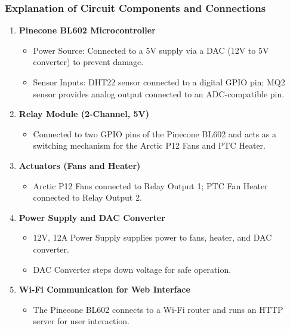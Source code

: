 \documentclass[a4paper]{scrartcl}
\begin{document}
\subsubsection{Explanation of Circuit Components and Connections}
\begin{enumerate}
    \item \textbf{Pinecone BL602 Microcontroller}
    \begin{itemize}
        \item Power Source: Connected to a 5V supply via a DAC (12V to 5V converter) to prevent damage.
        \item Sensor Inputs: DHT22 sensor connected to a digital GPIO pin; MQ2 sensor provides analog output connected to an ADC-compatible pin.
    \end{itemize}
    
    \item \textbf{Relay Module (2-Channel, 5V)}
    \begin{itemize}
        \item Connected to two GPIO pins of the Pinecone BL602 and acts as a switching mechanism for the Arctic P12 Fans and PTC Heater.
    \end{itemize}
    
    \item \textbf{Actuators (Fans and Heater)}
    \begin{itemize}
        \item Arctic P12 Fans connected to Relay Output 1; PTC Fan Heater connected to Relay Output 2.
    \end{itemize}
    
    \item \textbf{Power Supply and DAC Converter}
    \begin{itemize}
        \item 12V, 12A Power Supply supplies power to fans, heater, and DAC converter.
        \item DAC Converter steps down voltage for safe operation.
    \end{itemize}
    
    \item \textbf{Wi-Fi Communication for Web Interface}
    \begin{itemize}
        \item The Pinecone BL602 connects to a Wi-Fi router and runs an HTTP server for user interaction.
    \end{itemize}
\end{enumerate}
\end{document}
